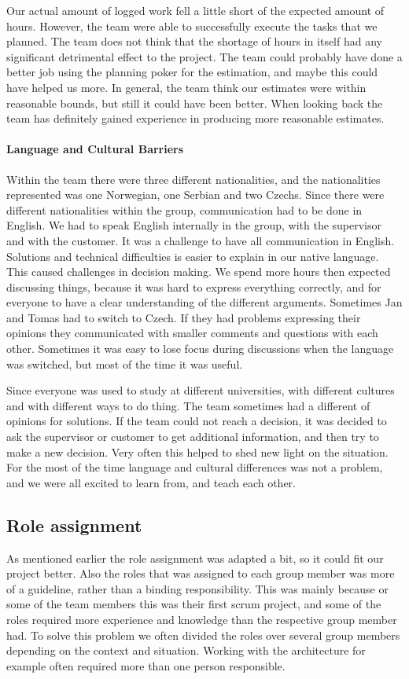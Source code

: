 Our actual amount of logged work fell a little short of the expected amount of hours. However, the team were able to successfully execute the tasks that we planned.   
The team does not think that the shortage of hours in itself had any significant detrimental effect to the project. The team could probably have done a better job using the planning poker for the estimation, and maybe this could have helped us more. In general, the team think our estimates were within reasonable bounds, but still it could have been better. When looking back the team has definitely gained experience in producing more reasonable estimates.

\paragraph{Language and Cultural Barriers}

Within the team there were three different nationalities, and the nationalities represented was one Norwegian, one Serbian and two Czechs. Since there were different nationalities within the group, communication had to be done in English. We had to speak English internally in the group, with the supervisor and with the customer. It was a challenge to have all communication in English. Solutions and 
technical difficulties is easier to explain in our native language. This caused challenges in decision making. We spend more hours then expected discussing things, because it was hard to express everything correctly, and for everyone to have a clear understanding of the different arguments. Sometimes Jan and Tomas had to switch to Czech. If they had problems expressing their opinions they communicated with smaller comments and questions with each other. Sometimes it was easy to lose focus during discussions when the language was switched, but most of the time it was useful.

Since everyone was used to study at different universities, with different cultures and with different ways to do thing. The team sometimes had a different of opinions for solutions. If the team could not reach a decision, it was decided to ask the supervisor or customer to get additional information, and then try to make a new decision. Very often this helped to shed new light on the situation.  For the most of the time language and cultural differences was not a problem, and we were all excited to learn from, and teach each other. 

\subsection{Role assignment}
As mentioned earlier the role assignment was adapted a bit, so it could fit our project better. Also the roles that was assigned to each group member was more of a guideline, rather than a binding responsibility. This was mainly because or some of the team members this was their first scrum project, and some of the roles required more experience and knowledge than the respective group member had. To solve this problem we often divided the roles over several group members depending on the context and situation. Working with the architecture for example often required more than one person responsible. 

